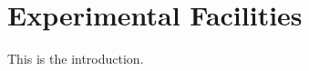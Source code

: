 \documentclass{standalone}
\begin{document}
\chapter{Experimental Facilities}

This is the introduction. \cite{Weber2011,Sarathy2013}
\end{document}
